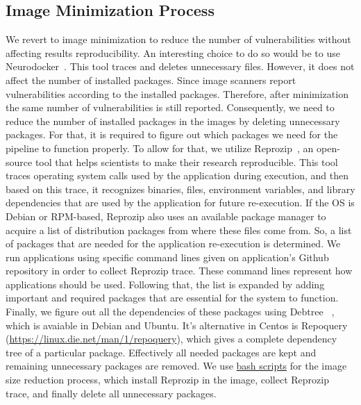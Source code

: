 \documentclass[a4paper,num-refs]{oup-contemporary}
\begin{document}
\subsection{Image Minimization Process}
We revert to image minimization to reduce the number of vulnerabilities without affecting results reproducibility.
An interesting choice to do so would be to use 
Neurodocker~\cite{neurodocker}.
This tool traces and deletes unnecessary files.
However, it does not affect the number of installed packages.
Since image scanners report vulnerabilities according to the installed
packages. Therefore, after
minimization the same number of vulnerabilities is still reported.
Consequently, we need to reduce the number of installed packages
in the images by deleting unnecessary packages. For that, it is required to figure
out which packages we need for the pipeline to function properly. To allow for that, we utilize
Reprozip~\cite{rampin2016reprozip}, an open-source tool that
helps scientists to make their research reproducible. This tool traces operating system calls used by the
application during execution, and then based on this trace, it recognizes binaries, files, environment variables,
and library dependencies that are used by the application for future re-execution. If the OS is
Debian or RPM-based, Reprozip also
uses an available package manager to acquire a list of distribution packages from where these files come from.
So, a list of packages that are needed for the application re-execution is determined. We run applications
using specific command lines given on application's Github repository in order to collect Reprozip trace.
These command lines represent how applications should be used.
Following that, the list
is expanded by adding important and required packages that are essential
for the system to function. Finally, we figure out all the dependencies of these packages using Debtree
~\cite{debtree}, which is avaiable in Debian and Ubuntu. It's alternative in Centos is Repoquery (\url{https://linux.die.net/man/1/repoquery}), which
gives a complete dependency tree of a particular package.
Effectively all needed packages are kept and remaining unnecessary packages are removed. We use
\href{https://github.com/kaurbhupinder/Vulnerability-Analysis/tree/master/Scripts/minification}{bash scripts} for
the image size reduction process, which install Reprozip in the image, collect Reprozip trace, and
finally delete all unnecessary packages.
\end{document}
